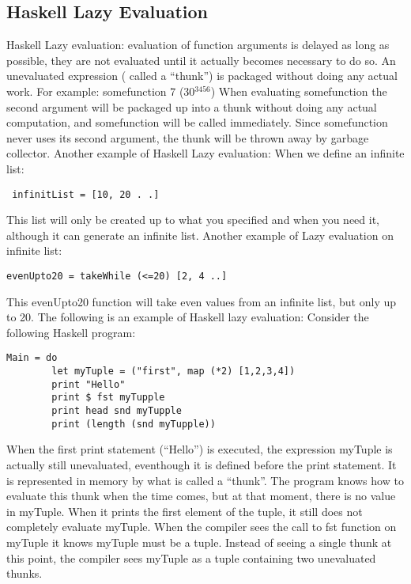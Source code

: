 \documentclass{article}
\begin{document}
\subsection{Haskell Lazy Evaluation}
Haskell Lazy evaluation: evaluation of function arguments is delayed as long as possible, they are not evaluated until it actually becomes necessary to do so. An unevaluated expression ( called a “thunk”) is packaged without doing any actual work.
\newline \newline For example:
\newline  \newline \indent somefunction 7 (30$^3456$)
\newline \newline When evaluating somefunction the second argument will be packaged up into a thunk without doing any actual computation, and somefunction will be called immediately. Since somefunction never uses its second argument, the thunk will be thrown away by garbage collector.
\newline \newline Another example of Haskell Lazy evaluation:
\newline When we define an infinite list: 
\begin{lstlisting}
 infinitList = [10, 20 . .]
\end{lstlisting}
This list will only be created up to what you specified and when you need it, although it can generate an infinite list.
\newline Another example of Lazy evaluation on infinite list:
\begin{lstlisting}
evenUpto20 = takeWhile (<=20) [2, 4 ..]
\end{lstlisting}
This evenUpto20 function will take even values from an infinite list, but only up to 20.
\newline \newline The following is an example of Haskell lazy evaluation:
\newline Consider the following Haskell program:
\begin{lstlisting}
Main = do
	    let myTuple = ("first", map (*2) [1,2,3,4])
	    print "Hello"
	    print $ fst myTupple
	    print head snd myTupple
	    print (length (snd myTupple))
\end{lstlisting}
When the first print statement (“Hello”) is executed, the expression myTuple is actually still unevaluated, eventhough it is defined before the print statement. It is represented in memory by what is called a “thunk”. The program knows how to evaluate this thunk when the time comes, but at that moment, there is no value in myTuple. When it prints the first element of the tuple, it still does not completely evaluate myTuple. When the compiler sees the call to fst function on myTuple it knows myTuple must be a tuple. Instead of seeing a single thunk at this point, the compiler sees myTuple as a tuple containing two unevaluated thunks.
\end{document}
